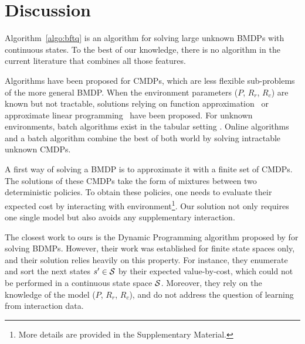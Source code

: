 \documentclass{article}
\begin{document}
\section{Discussion}

Algorithm~\ref{algo:bftq} is an algorithm for solving large unknown BMDPs with continuous states. To the best of our knowledge, there is no algorithm in the current literature that combines all those features.


Algorithms have been proposed for CMDPs, which are less flexible sub-problems of the more general BMDP. When the environment parameters ($P$, $R_r$, $R_c$) are known but not tractable, solutions relying on function approximation~\citep{Undurti} or approximate linear programming~\citep{Poupart2015} have been proposed. For unknown environments, batch algorithms exist in the tabular setting \citep{Thomas2015, Petrik2016, Laroche2017}. Online algorithms \citep{Geibel2005, Abe2010,ChowGJP15,AchiamHTA17} and a batch algorithm \citep{le2019batch} combine the best of both world by solving intractable unknown CMDPs.

A first way of solving a BMDP is to approximate it with a finite set of CMDPs. The solutions of these CMDPs take the form of mixtures between two deterministic policies\citep[Theorem 4.4][]{BEUTLER1985236}. To obtain these policies, one needs to evaluate their expected cost by interacting with environment\footnote{More details are provided in the Supplementary Material.}. Our solution not only requires one single model but also avoids any supplementary interaction.

The closest work to ours is the Dynamic Programming algorithm proposed by \citet{Boutilier_Lu:uai16} for solving BDMPs. However, their work was established for finite state spaces only, and their solution relies heavily on this property. For instance, they enumerate and sort the next states $s'\in\mathcal{S}$ by their expected value-by-cost, which could not be performed in a continuous state space $\mathcal{S}$. Moreover, they rely on the knowledge of the model ($P$, $R_r$, $R_c$), and do not address the question of learning from interaction data.
\end{document}
